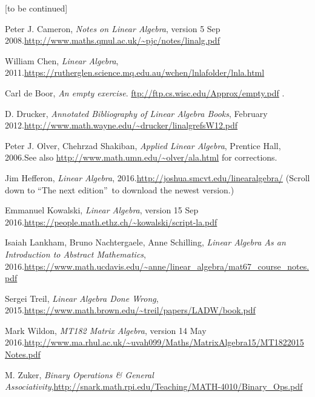 \documentclass[numbers=enddot,12pt,final,onecolumn,notitlepage]{scrartcl}%
\theoremstyle{definition}
\begin{document}
[to be continued]

\begin{thebibliography}{999999999}                                                                                        %


Peter J. Cameron, \textit{Notes on Linear
Algebra}, version 5 Sep 2008.\newline\url{http://www.maths.qmul.ac.uk/~pjc/notes/linalg.pdf}

William Chen, \textit{Linear Algebra}, 2011.\newline\url{https://rutherglen.science.mq.edu.au/wchen/lnlafolder/lnla.html}

Carl de Boor, \textit{An empty exercise}.
\url{ftp://ftp.cs.wisc.edu/Approx/empty.pdf} .

D. Drucker, \textit{Annotated Bibliography of
Linear Algebra Books}, February 2012.\newline\url{http://www.math.wayne.edu/~drucker/linalgrefsW12.pdf}

Peter J. Olver, Chehrzad Shakiban, \textit{Applied
Linear Algebra}, Prentice Hall, 2006.\newline See also
\url{http://www.math.umn.edu/~olver/ala.html} for corrections.

Jim Hefferon, \textit{Linear Algebra},
2016.\newline\url{http://joshua.smcvt.edu/linearalgebra/} (Scroll down to
\textquotedblleft The next edition\textquotedblright\ to download the newest version.)

Emmanuel Kowalski, \textit{Linear Algebra},
version 15 Sep 2016.\newline\url{https://people.math.ethz.ch/~kowalski/script-la.pdf}

Isaiah Lankham, Bruno Nachtergaele, Anne
Schilling, \textit{Linear Algebra As an Introduction to Abstract Mathematics},
2016.\newline\url{https://www.math.ucdavis.edu/~anne/linear_algebra/mat67_course_notes.pdf}

Sergei Treil, \textit{Linear Algebra Done Wrong},
2015.\newline\url{https://www.math.brown.edu/~treil/papers/LADW/book.pdf}

Mark Wildon, \textit{MT182 Matrix Algebra},
version 14 May 2016.\newline\url{http://www.ma.rhul.ac.uk/~uvah099/Maths/MatrixAlgebra15/MT1822015Notes.pdf}

M. Zuker, \textit{Binary Operations \& General
Associativity},\newline\url{http://snark.math.rpi.edu/Teaching/MATH-4010/Binary_Ops.pdf}
\end{thebibliography}
\end{document}
